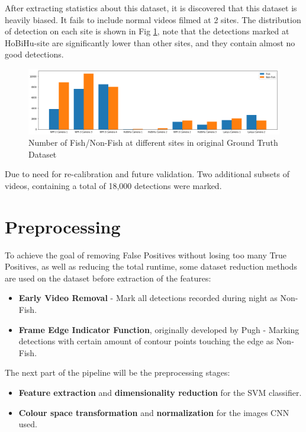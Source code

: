 \documentclass[bsc,logo,twoside,fullspacing,parskip]{infthesis}
\begin{document}
After extracting statistics about this dataset, it is discovered that this dataset is heavily biased. 
It fails to include normal videos filmed at 2 sites. The distribution of detection on each site is shown in Fig \ref{fig:gtdist}, note that the detections marked at HoBiHu-site are significantly lower than other sites, and they contain almost no good detections.

\begin{figure}[h]
    \centering
    \includegraphics[scale=0.34]{graph/classdist.png}
    \caption{Number of Fish/Non-Fish at different sites in original Ground Truth Dataset}
    \label{fig:gtdist}
\end{figure}

Due to need for re-calibration and future validation. 
Two additional subsets of videos, containing a total of 18,000 detections were marked.

\chapter{Preprocessing}
\label{chap:prepro}

To achieve the goal of removing False Positives without losing too many True Positives, as well as reducing the total runtime, some dataset reduction methods are used on the dataset before extraction of the features: 

\begin{itemize}
\setlength{\parskip}{1pt}
\item \textbf{Early Video Removal} - Mark all detections recorded during night as Non-Fish.
\item \textbf{Frame Edge Indicator Function}, originally developed by Pugh\cite{Pugh} - Marking detections with certain amount of contour points touching the edge as Non-Fish. 
\end{itemize}

The next part of the pipeline will be the preprocessing stages:

\begin{itemize}
\setlength{\parskip}{1pt}
\item \textbf{Feature extraction} and \textbf{dimensionality reduction} for the SVM classifier.
\item \textbf{Colour space transformation} and \textbf{normalization} for the images CNN used. 
\end{itemize}
\end{document}
